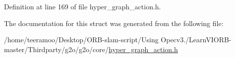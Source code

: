 Definition at line 169 of file hyper\+\_\+graph\+\_\+action.\+h.



The documentation for this struct was generated from the following file\+:\begin{DoxyCompactItemize}
\item 
/home/teeramoo/\+Desktop/\+O\+R\+B-\/slam-\/script/\+Using Opecv3./\+Learn\+V\+I\+O\+R\+B-\/master/\+Thirdparty/g2o/g2o/core/\hyperlink{hyper__graph__action_8h}{hyper\+\_\+graph\+\_\+action.\+h}\end{DoxyCompactItemize}
